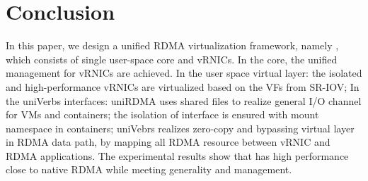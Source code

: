 \section{Conclusion} \label{conclusion}
In this paper, we design a unified RDMA virtualization framework, namely \sys, which consists of single user-space \sys core and vRNICs. In the \sys core, the unified management for vRNICs are achieved. In the user space virtual layer: the isolated and high-performance vRNICs are virtualized based on the VFs from SR-IOV; In the uniVerbs interfaces: uniRDMA uses shared files to realize general I/O channel for VMs and containers; the isolation of interface is ensured with mount namespace in containers; uniVebrs realizes zero-copy and bypassing virtual layer in RDMA data path, by mapping all RDMA resource between vRNIC and RDMA applications. The experimental results show that \sys has high performance close to native RDMA while meeting generality and management.